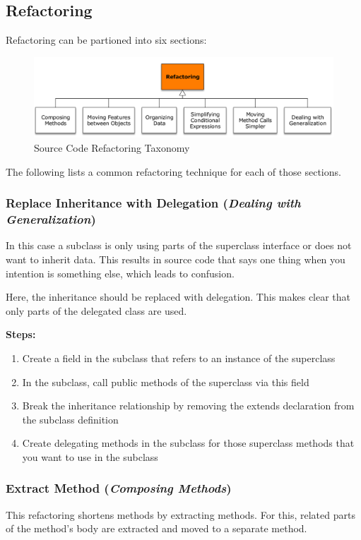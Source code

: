 \subsection{Refactoring}
Refactoring can be partioned into six sections:

\begin{figure}[h]
	\centering
	\includegraphics[width=\linewidth]{images/refactoring_taxonomy}
	\caption{Source Code Refactoring Taxonomy}
\end{figure}

The following lists a common refactoring technique for each of those sections.


\subsubsection*{Replace Inheritance with Delegation (\textit{Dealing with Generalization})}
In this case a subclass is only using parts of the superclass interface or does not want to inherit data.
This results in source code that says one thing when you intention is something else, which leads to confusion.

Here, the inheritance should be replaced with delegation.
This makes clear that only parts of the delegated class are used.\newline 

\textbf{Steps:}
\begin{enumerate}
	\item Create a field in the subclass that refers to an instance of the superclass
	\item In the subclass, call public methods of the superclass via this
	field
	\item Break the inheritance relationship by removing the extends declaration from the subclass definition
	\item Create delegating methods in the subclass for those
	superclass methods that you want to use in the subclass
\end{enumerate}

\subsubsection*{Extract Method (\textit{Composing Methods})}
This refactoring shortens methods by extracting methods.
For this, related parts of the method's body are extracted and moved to a separate method.

